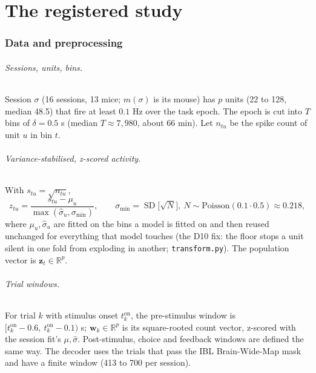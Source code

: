 \documentclass[11pt]{article}
\newcommand{\R}{\mathbb{R}}
\begin{document}
\part{The registered study}

\section{Data and preprocessing}

\paragraph{Sessions, units, bins.} Session $\sigma$ (16 sessions, 13 mice; $m(\sigma)$ is its mouse) has $p$ units
(22 to 128, median 48.5) that fire at least $0.1$ Hz over the task epoch. The epoch is cut into $T$ bins of
$\delta = 0.5$ s (median $T \approx 7{,}980$, about 66 min). Let $n_{tu}$ be the spike count of unit $u$ in bin $t$.

\paragraph{Variance-stabilised, z-scored activity.} With $s_{tu} = \sqrt{n_{tu}}$,
\begin{equation}
z_{tu} = \frac{s_{tu} - \mu_u}{\max(\hat\sigma_u, \sigma_{\min})},
\qquad \sigma_{\min} = \operatorname{SD}\!\big[\sqrt{N}\big],\ N \sim \mathrm{Poisson}(0.1 \cdot 0.5) \approx 0.218,
\label{eq:z}
\end{equation}
where $\mu_u, \hat\sigma_u$ are fitted on the bins a model is fitted on and then reused unchanged for everything that
model touches (the D10 fix: the floor stops a unit silent in one fold from exploding in another;
\texttt{transform.py}). The population vector is $\bm z_t \in \R^p$.

\paragraph{Trial windows.} For trial $k$ with stimulus onset $t^{\mathrm{on}}_k$, the pre-stimulus window is
$[t^{\mathrm{on}}_k - 0.6,\ t^{\mathrm{on}}_k - 0.1)$ s; $\bm w_k \in \R^p$ is its square-rooted count vector,
z-scored with the session fit's $\mu,\hat\sigma$. Post-stimulus, choice and feedback windows are defined the same way.
The decoder uses the trials that pass the IBL Brain-Wide-Map mask and have a finite window (413 to 700 per session).
\end{document}
